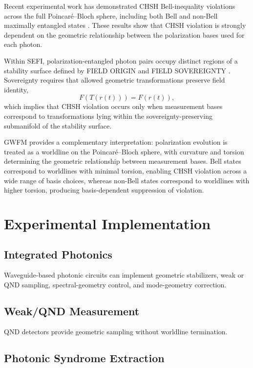 \documentclass[aip, reprint, superscriptaddress]{revtex4-2}
\begin{document}
Recent experimental work has demonstrated CHSH Bell-inequality violations across the 
full Poincar\'e--Bloch sphere, including both Bell and non-Bell maximally entangled 
states \cite{CardosoIsidoro2026}. These results show that CHSH violation is strongly 
dependent on the geometric relationship between the polarization bases used for each 
photon.

Within SEFI, polarization-entangled photon pairs occupy distinct regions of a stability 
surface defined by FIELD ORIGIN and FIELD SOVEREIGNTY \cite{DuttonSEFI}. 
Sovereignty requires that allowed geometric transformations preserve field identity,
\begin{equation}
F(T(r(t))) = F(r(t)),
\end{equation}
which implies that CHSH violation occurs only when measurement bases correspond to 
transformations lying within the sovereignty-preserving submanifold of the stability 
surface.

GWFM provides a complementary interpretation: polarization evolution is treated as a 
worldline on the Poincar\'e--Bloch sphere, with curvature and torsion determining the 
geometric relationship between measurement bases. Bell states correspond to worldlines 
with minimal torsion, enabling CHSH violation across a wide range of basis choices, 
whereas non-Bell states correspond to worldlines with higher torsion, producing 
basis-dependent suppression of violation.

\section{Experimental Implementation}

\subsection{Integrated Photonics}

Waveguide-based photonic circuits can implement geometric stabilizers, weak or QND 
sampling, spectral-geometry control, and mode-geometry correction.

\subsection{Weak/QND Measurement}

QND detectors provide geometric sampling without worldline termination.

\subsection{Photonic Syndrome Extraction}
\end{document}
